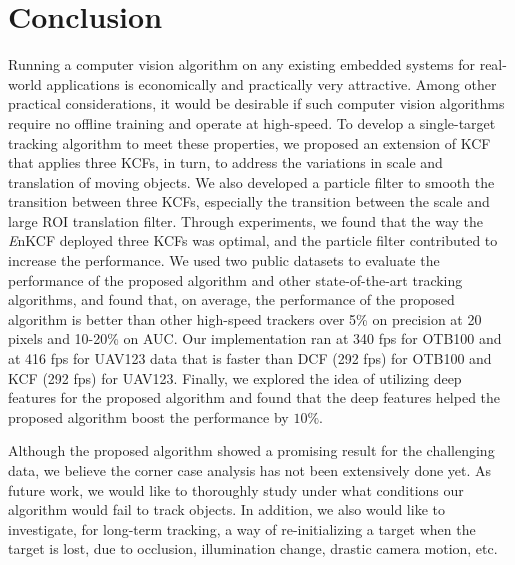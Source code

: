 \documentclass[10pt,twocolumn,letterpaper]{article}
\begin{document}
\section{Conclusion} \label{sc:Conclusion}
Running a computer vision algorithm on any existing embedded systems
for real-world applications is economically and practically very
attractive. Among other practical considerations, it would be
desirable if such computer vision algorithms require no offline
training and operate at high-speed. To develop a single-target
tracking algorithm to meet these properties, we proposed an extension
of KCF that applies three KCFs, in turn, to address the variations in
scale and translation of moving objects. We also developed a particle
filter to smooth the transition between three KCFs, especially the
transition between the scale and large ROI translation filter. Through
experiments, we found that the way the {\it E}nKCF deployed three KCFs
was optimal, and the particle filter contributed to increase the
performance.  We used two public datasets to evaluate the performance
of the proposed algorithm and other state-of-the-art tracking
algorithms, and found that, on average, the performance of the
proposed algorithm is better than other high-speed trackers over 5\%
on precision at 20 pixels and 10-20\% on AUC. Our implementation ran
at 340 fps for OTB100 and at 416 fps for UAV123 data that is faster
than DCF (292 fps) for OTB100 and KCF (292 fps) for UAV123. Finally,
we explored the idea of utilizing deep features for the proposed
algorithm and found that the deep features helped the proposed
algorithm boost the performance by $10\%$.

Although the proposed algorithm showed a promising result for the
challenging data, we believe the corner case analysis has not been
extensively done yet. As future work, we would like to thoroughly
study under what conditions our algorithm would fail to track
objects. In addition, we also would like to investigate, for long-term
tracking, a way of re-initializing a target when the target is lost,
due to occlusion, illumination change, drastic camera motion, etc.

{\small


}
\end{document}
